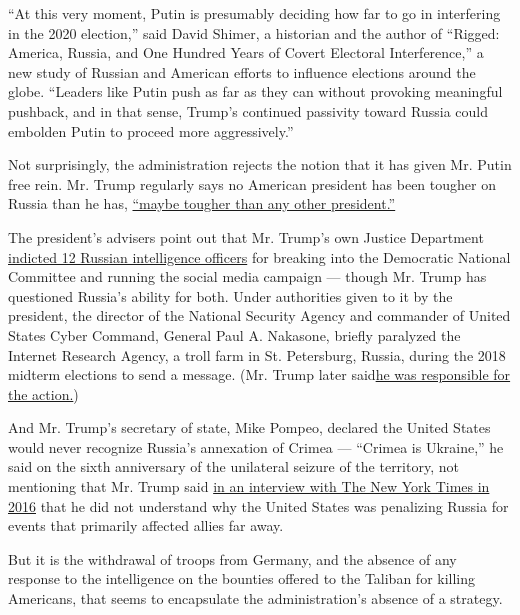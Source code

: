 ``At this very moment, Putin is presumably deciding how far to go in
interfering in the 2020 election,'' said David Shimer, a historian and
the author of ``Rigged: America, Russia, and One Hundred Years of Covert
Electoral Interference,'' a new study of Russian and American efforts to
influence elections around the globe. ``Leaders like Putin push as far
as they can without provoking meaningful pushback, and in that sense,
Trump's continued passivity toward Russia could embolden Putin to
proceed more aggressively.''

Not surprisingly, the administration rejects the notion that it has
given Mr. Putin free rein. Mr. Trump regularly says no American
president has been tougher on Russia than he has,
\href{https://thehill.com/homenews/administration/425034-trump-i-have-been-tougher-on-russia-that-any-other-president}{``maybe
tougher than any other president.''}

The president's advisers point out that Mr. Trump's own Justice
Department
\href{https://www.nytimes.com/2018/07/13/us/politics/mueller-indictment-russian-intelligence-hacking.html}{indicted
12 Russian intelligence officers} for breaking into the Democratic
National Committee and running the social media campaign --- though Mr.
Trump has questioned Russia's ability for both. Under authorities given
to it by the president, the director of the National Security Agency and
commander of United States Cyber Command, General Paul A. Nakasone,
briefly paralyzed the Internet Research Agency, a troll farm in St.
Petersburg, Russia, during the 2018 midterm elections to send a message.
(Mr. Trump later
said\href{https://www.nytimes.com/2020/07/11/us/politics/trump-russia-cyber-attack.html}{he
was responsible for the action.})

And Mr. Trump's secretary of state, Mike Pompeo, declared the United
States would never recognize Russia's annexation of Crimea --- ``Crimea
is Ukraine,'' he said on the sixth anniversary of the unilateral seizure
of the territory, not mentioning that Mr. Trump said
\href{https://www.nytimes.com/2016/03/27/us/politics/donald-trump-transcript.html}{in
an interview with The New York Times in 2016} that he did not understand
why the United States was penalizing Russia for events that primarily
affected allies far away.

But it is the withdrawal of troops from Germany, and the absence of any
response to the intelligence on the bounties offered to the Taliban for
killing Americans, that seems to encapsulate the administration's
absence of a strategy.

